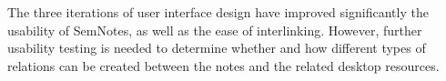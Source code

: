 The three iterations of user interface design have improved significantly the usability of SemNotes, as well as the ease of interlinking. However, further usability testing is needed to determine whether and how different types of relations can be created between the notes and the related desktop resources. 
